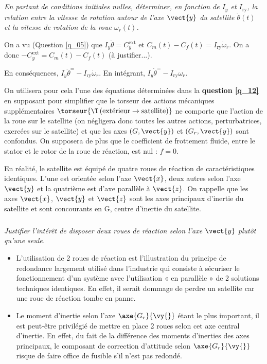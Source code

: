 \subparagraph{\label{q_14}}\textit{
  En partant de conditions initiales nulles, déterminer, en fonction de
  $I_y$ et $I_{\text{ry}}$, la relation entre la vitesse de rotation autour de l'axe $\vect{y}$ du
  satellite $\dot{\theta}(t)$ et la vitesse de rotation de la roue $\omega_r(t)$.}
  \ifprof
\begin{corrige}
On a vu (Question \ref{q_05}) que $I_y \ddot{\theta} = C_y^{\text{ext}}$ et 
$C_m(t)-C_f(t) = I_{\text{ry}}\dot{\omega}_r$. On a donc $- C_y^{\text{ext}} = C_m(t)-C_f(t)$ (à justifier...). 

En conséquences, $I_y \ddot{\theta} ^= - I_{\text{ry}}\dot{\omega}_r$. En intégrant, 
$I_y \dot{\theta} ^= - I_{\text{ry}}\omega_r$.
\end{corrige}
\else
\fi

  \ifprof
\else

   On utilisera pour cela l'une des équations déterminées dans la \textbf{question \ref{q_12}} en supposant pour simplifier que le torseur des actions mécaniques supplémentaires $\torseur{\T\left(\text{extérieur}\to \text{satellite}\right)}$
  ne comporte que l'action de la roue sur le satellite (on négligera
  donc toutes les autres actions, perturbatrices, exercées sur le
  satellite) et que les axes $\left(G,\vect{y}\right)$ et $\left(G_r,\vect{y}\right)$ sont confondus. On supposera de plus que
  le coefficient de frottement fluide, entre le stator et le rotor de la
  roue de réaction, est nul : $f=0$.

En réalité, le satellite est équipé de quatre roues de réaction de
caractéristiques identiques. L'une est orientée selon l'axe $\vect{x}$, deux autres
selon l'axe $\vect{y}$ et la quatrième est d'axe parallèle à $\vect{z}$. On rappelle que les axes $\vect{x}$, $\vect{y}$ et $\vect{z}$ sont les axes principaux d'inertie du satellite et sont concourants en G, centre d'inertie du satellite.
\fi

\subparagraph{\label{q_15}}\textit{ Justifier l'intérêt de disposer deux roues de réaction selon
  l'axe $\vect{y}$ plutôt qu'une seule.}
\ifprof
\begin{corrige}
\begin{itemize}
\item L’utilisation de 2 roues de réaction est l’illustration du principe de redondance
largement utilisé dans l’industrie qui consiste à sécuriser le fonctionnement d’un
système avec l’utilisation « en parallèle » de 2 solutions techniques identiques. En
effet, il serait dommage de perdre un satellite car une roue de réaction tombe en panne.
\item Le moment d’inertie selon l’axe $\axe{G_r}{\vy{}}$ étant le plus important, il est peut-être
privilégié de mettre en place 2 roues selon cet axe central d’inertie. En effet, du fait de
la différence des moments d’inerties des axes principaux, le composant de correction
d’attitude selon $\axe{G_r}{\vy{}}$ risque de faire office de fusible s’il n’est pas redondé.
\end{itemize}
\end{corrige}
\else
\fi

